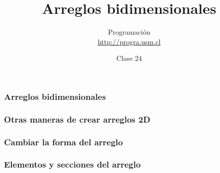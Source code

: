 \documentclass[12pt]{beamer}
\title{Arreglos bidimensionales}
\author{
  Programación \\ \url{http://progra.usm.cl}
}
\date{Clase 24}
\begin{document}
  \begin{frame}
    \maketitle
  \end{frame}

  \begin{frame}
    \label{crear-arreglo-bidmensional}
    \frametitle{Arreglos bidimensionales}
    
  \end{frame}

  \begin{frame}
    \label{crear-arreglo-bidmensional-funciones}
    \frametitle{Otras maneras de crear arreglos 2D}
    
  \end{frame}

  \begin{frame}
    \label{cambiar-forma}
    \frametitle{Cambiar la forma del arreglo}
    
  \end{frame}

  \begin{frame}
    \label{indices}
    \frametitle{Elementos y secciones del arreglo}
    
  \end{frame}
\end{document}
